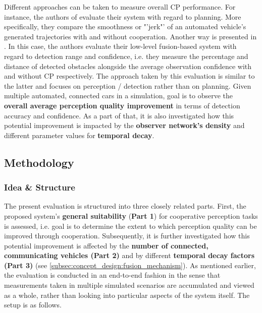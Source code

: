 Different approaches can be taken to measure overall CP performance. For instance, the authors of \cite{liu2013motion} evaluate their system with regard to planning. More specifically, they compare the smoothness or "'jerk"' of an automated vehicle's generated trajectories with and without cooperation. Another way is presented in \cite{Chen2019}. In this case, the authors evaluate their low-level fusion-based system with regard to detection range and confidence, i.e. they measure the percentage and distance of detected obstacles alongside the average observation confidence with and without CP respectively. The approach taken by this evaluation is similar to the latter and focuses on perception / detection rather than on planning. Given multiple automated, connected cars in a simulation, goal is to observe the \textbf{overall average perception quality improvement} in terms of detection accuracy and confidence. As a part of that, it is also investigated how this potential improvement is impacted by the \textbf{observer network's density} and different parameter values for \textbf{temporal decay}.

\subsection{Methodology}
\label{subsec:evaluation:perception_evaluation:methodology}

\subsubsection{Idea \& Structure}
The present evaluation is structured into three closely related parts. First, the proposed system's \textbf{general suitability} (\textbf{Part 1}) for cooperative perception tasks is assessed, i.e. goal is to determine the extent to which perception quality can be improved through cooperation. Subsequently, it is further investigated how this potential improvement is affected by the \textbf{number of connected, communicating vehicles (Part 2)} and by different \textbf{temporal decay factors (Part 3)} (see \cref{subsec:concept_design:fusion_mechanism}). As mentioned earlier, the evaluation is conducted in an end-to-end fashion in the sense that measurements taken in multiple simulated scenarios are accumulated and viewed as a whole, rather than looking into particular aspects of the system itself. The setup is as follows.
\par
\bigskip

